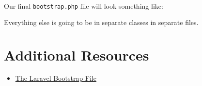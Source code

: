 \hr

Our final \texttt{bootstrap.php} file will look something like:


Everything else is going to be in separate classes in separate files.


\section{Additional Resources}

\begin{itemize}[leftmargin=*]
    \item \href{https://github.com/laravel/laravel/blob/master/bootstrap/app.php}{The Laravel Bootstrap File}
\end{itemize}
